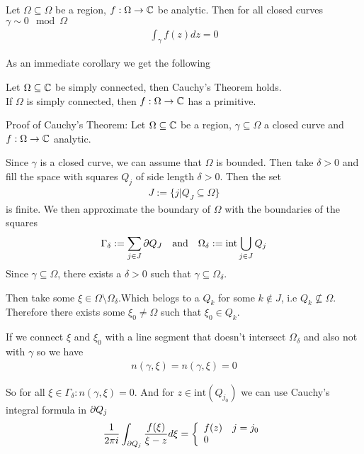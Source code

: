 \begin{ntheorem}
	Let $\Omega \subseteq \Omega$ be a region, $f: \Omega \to \mathbb{C}$ be analytic. Then for all closed curves $\gamma \sim 0 \mod \Omega$
	\begin{align*}
		\int_{\gamma} f(z) dz = 0
	\end{align*}
\end{ntheorem}
As an immediate corollary we get the following

\begin{corollary}[]
Let $\Omega \subseteq \mathbb{C}$ be simply connected, then Cauchy's Theorem holds.\\

If $\Omega$ is simply connected, then $f: \Omega \to \mathbb{C}$ has a primitive.
\end{corollary}


Proof of Cauchy's Theorem: Let $\Omega \subseteq \mathbb{C}$ be a region, $\gamma \subseteq \Omega$ a closed curve and $f: \Omega \to \mathbb{C}$ analytic.

Since $\gamma$ is a closed curve, we can assume that $\Omega$ is bounded. Then take $\delta > 0$ and fill the space with squares $Q_j$ of side length $\delta >0$. Then the set
\begin{align*}
	J := \{j \big\vert Q_J \subseteq \Omega\}	
\end{align*}
is finite. We then approximate the boundary of $\Omega$ with the boundaries of the squares
\begin{align*}
	\Gamma_{\delta} := \sum_{j \in J} \partial Q_J \quad \text{and} \quad \Omega_{\delta} := \text{int} \bigcup_{j \in J} Q_j
\end{align*}
Since $\gamma \subseteq \Omega$, there exists a $\delta > 0$ such that $\gamma \subseteq \Omega_{\delta}$.

Then take some $\xi \in \Omega \setminus \Omega_{\delta}$.Which belogs to a $Q_k$ for some $k \notin J$, i.e $Q_k \not\subseteq \Omega$. Therefore there exists some $\xi_0 \neq \Omega$ such that $\xi_0 \in Q_k$.

If we connect $\xi$ and $\xi_0$ with a line segment that doesn't intersect $\Omega_{\delta}$ and also not with $\gamma$ so we have
\begin{align*}
	n(\gamma,\xi) = n(\gamma,\xi) = 0
\end{align*}

So for all $\xi \in \Gamma_{\delta}: n(\gamma,\xi) = 0$. And for $z \in \text{int}(Q_{j_0})$ we can use Cauchy's integral formula in $\partial Q_j$
\begin{align*}
	\frac{1}{2\pi i} \int_{\partial Q_j} \frac{f(\xi)}{\xi - z}d \xi = \left\{\begin{array}{ll}
			f(z) & j = j_0\\
		 0 & 
	\end{array} \right.	
\end{align*}

